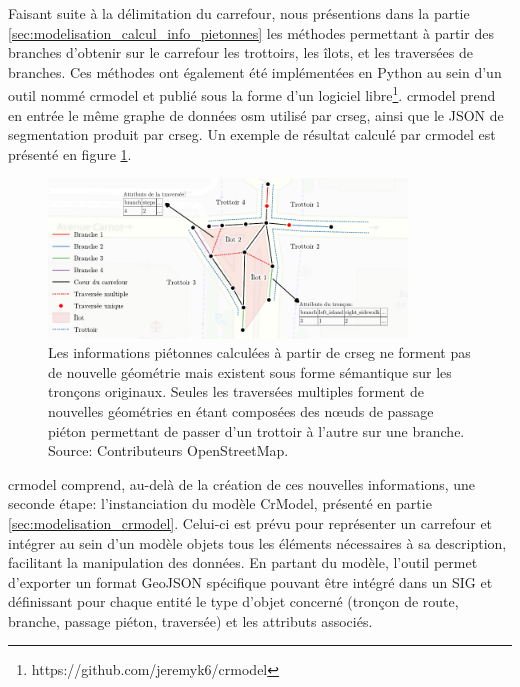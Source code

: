 \newpar{}

Faisant suite à la délimitation du carrefour, nous présentions dans la partie \ref{sec:modelisation_calcul_info_pietonnes} les méthodes permettant à partir des branches d'obtenir sur le carrefour les trottoirs, les îlots, et les traversées de branches. Ces méthodes ont également été implémentées en Python au sein d'un outil nommé crmodel et publié sous la forme d'un logiciel libre\footnote{https://github.com/jeremyk6/crmodel}. crmodel prend en entrée le même graphe de données \gls{osm} utilisé par crseg, ainsi que le JSON de segmentation produit par crseg. Un exemple de résultat calculé par crmodel est présenté en figure \ref{fig:experimentation_crmodel_info_pietonne}.

\begin{figure}[ht]
    \centering
    \includegraphics[width=0.85\textwidth]{images/experimentation/donnees_crmodel.pdf}
    \caption[Données produites par crmodel]{Les informations piétonnes calculées à partir de crseg ne forment pas de nouvelle géométrie mais existent sous forme sémantique sur les tronçons originaux. Seules les traversées multiples forment de nouvelles géométries en étant composées des nœuds de passage piéton permettant de passer d'un trottoir à l'autre sur une branche. Source: Contributeurs OpenStreetMap.}
    \label{fig:experimentation_crmodel_info_pietonne}
\end{figure}

\newpar{}

crmodel comprend, au-delà de la création de ces nouvelles informations, une seconde étape: l'instanciation du modèle CrModel, présenté en partie \ref{sec:modelisation_crmodel}. Celui-ci est prévu pour représenter un carrefour et intégrer au sein d'un modèle objets tous les éléments nécessaires à sa description, facilitant la manipulation des données. En partant du modèle, l'outil permet d'exporter un format GeoJSON spécifique pouvant être intégré dans un SIG et définissant pour chaque entité le type d'objet concerné (tronçon de route, branche, passage piéton, traversée) et les attributs associés.

